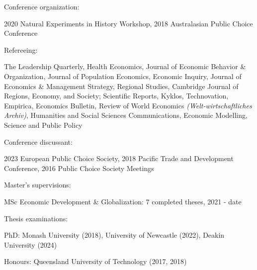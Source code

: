 \documentclass[letterpaper]{article}
\renewenvironment{itemize}{
  \begin{list}{}{
    \setlength{\leftmargin}{1.5em}
  }
}{
  \end{list}
}
\begin{document}
\begin{itemize}
	\item Conference organization:
	\begin{itemize}
		\item	2020 Natural Experiments in History Workshop, 2018 Australasian Public Choice Conference
	\end{itemize}
	

	
	\item Refereeing:
	\begin{itemize}
		
		\item The Leadership Quarterly, Health Economics, Journal of Economic Behavior \& Organization, Journal of Population Economics, Economic Inquiry, Journal of Economics \& Management Strategy, Regional Studies, Cambridge Journal of Regions, Economy, and Society; Scientific Reports, Kyklos, Technovation, Empirica, Economics Bulletin, Review of World Economics {\textit{(Welt-wirtschaftliches Archiv)}}, Humanities and Social Sciences Communications, Economic Modelling, Science and Public Policy	\end{itemize}
	
	\item Conference discussant:
	\begin{itemize}
		
		\item 2023 European Public Choice Society, 2018 Pacific Trade and Development Conference, 2016 Public Choice Society Meetings
	\end{itemize}
	
	
		\item Master's supervisions:
	\begin{itemize}
		\item MSc Economic Development \& Globalization: 7 completed theses, 2021 - date
	\end{itemize}
	
	\item Thesis examinations:
	\begin{itemize}
		\item PhD: Monash University (2018), University of Newcastle (2022), Deakin University (2024)
		\item Honours: Queensland University of Technology (2017, 2018)
	\end{itemize}
	
	
\end{itemize}
\end{document}
